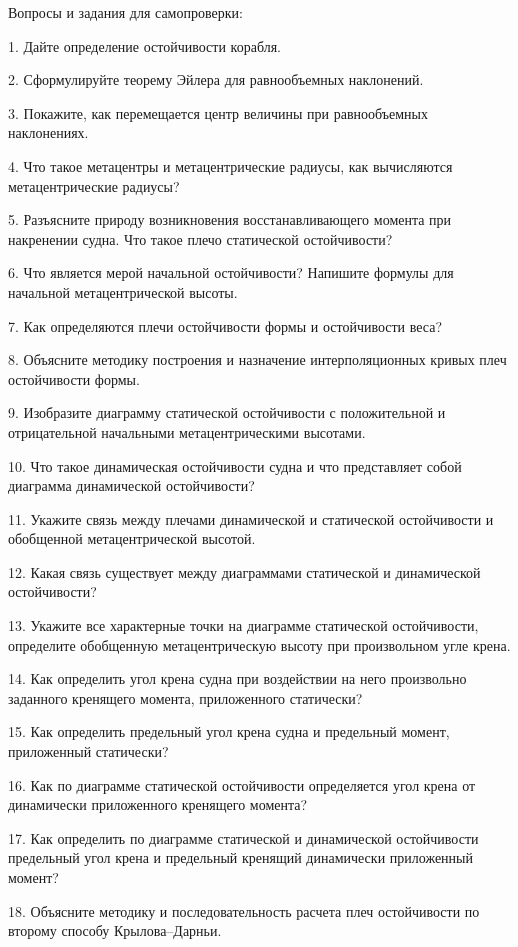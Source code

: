 \vspace{0.5cm}

Вопросы и задания для самопроверки:

1.	Дайте определение остойчивости корабля.

2.	Сформулируйте теорему Эйлера для равнообъемных наклонений.

3.	Покажите, как перемещается центр величины при равнообъемных наклонениях.

4.	Что такое метацентры и метацентрические радиусы, как вычисляются метацентрические радиусы?

5.	Разъясните природу возникновения восстанавливающего момента при накренении судна.
Что такое плечо статической остойчивости?

6.	Что является мерой начальной остойчивости?
Напишите формулы для начальной метацентрической высоты.

7.	Как определяются плечи остойчивости формы и остойчивости веса?

8.	Объясните методику построения и назначение интерполяционных кривых плеч остойчивости формы.

9.	Изобразите диаграмму статической остойчивости с положительной и отрицательной начальными метацентрическими высотами.

10.	Что такое динамическая остойчивости судна и что представляет собой диаграмма динамической остойчивости?

11.	Укажите связь между плечами динамической и статической остойчивости и обобщенной метацентрической высотой.

12.	Какая связь существует между диаграммами статической и динамической остойчивости?

13.	Укажите все характерные точки на диаграмме статической остойчивости, определите обобщенную метацентрическую высоту при произвольном угле крена.

14.	Как определить угол крена судна при воздействии на него произвольно заданного кренящего момента, приложенного статически?

15.	Как определить предельный угол крена судна и предельный момент, приложенный статически?

16.	Как по диаграмме статической остойчивости определяется угол крена от динамически приложенного кренящего момента?

17.	Как определить по диаграмме статической и динамической остойчивости предельный угол крена и предельный кренящий динамически приложенный момент?

18.	Объясните методику и последовательность расчета плеч остойчивости по второму способу Крылова–Дарньи.

